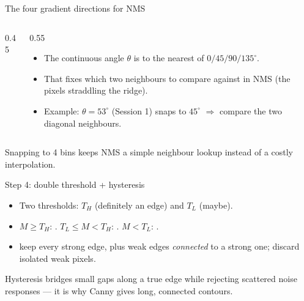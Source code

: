 \documentclass[10pt,aspectratio=169]{beamer}
\begin{document}
\begin{frame}{The four gradient directions for NMS}
  \begin{columns}[T]
    \begin{column}{0.45\textwidth}
      \begin{center}
      \end{center}
    \end{column}
    \begin{column}{0.55\textwidth}
      \begin{itemize}
        \item The continuous angle $\theta$ is  to the nearest of $0/45/90/135^\circ$.
        \item That fixes which two neighbours to compare against in NMS (the pixels straddling the ridge).
        \item Example: $\theta = 53^\circ$ (Session 1) snaps to $45^\circ$ $\Rightarrow$ compare the two diagonal neighbours.
      \end{itemize}
    \end{column}
  \end{columns}
  \begin{infobox}
    Snapping to 4 bins keeps NMS a simple neighbour lookup instead of a costly interpolation.
  \end{infobox}
\end{frame}

\begin{frame}{Step 4: double threshold + hysteresis}
  \begin{itemize}
    \item Two thresholds:  $T_H$ (definitely an edge) and  $T_L$ (maybe).
    \item $M \geq T_H$: . $T_L \leq M < T_H$: . $M < T_L$: .
    \item {} keep every strong edge, plus weak edges \emph{connected} to a strong one; discard isolated weak pixels.
  \end{itemize}
  \begin{goodbox}
    Hysteresis bridges small gaps along a true edge while rejecting scattered noise responses —
    it is why Canny gives long, connected contours.
  \end{goodbox}
\end{frame}
\end{document}
